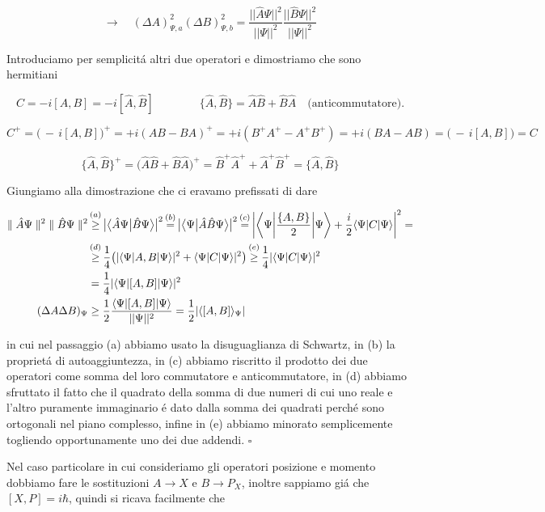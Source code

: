 $$\longrightarrow\quad(\Delta A)^{2}_{\Psi,a}(\Delta B)^{2}_{\Psi,b}=\frac{||\hat{A}\Psi||^{2}}{||\Psi||^{2}}\frac{||\hat{B}\Psi||^{2}}{||\Psi||^{2}}$$  

Introduciamo per semplicit\'a altri due operatori e dimostriamo che sono hermitiani

$$C=-i[A,B]=-i[\hat{A},\hat{B}]\qquad\qquad\{\hat{A},\hat{B}\}=\hat{A}\hat{B}+\hat{B}\hat{A}\quad\text{(anticommutatore)}.$$
	
	
$$C^+=\big(\,-\,i[A,B]\big)^+=+i(AB-BA)^+=+i(B^+A^+-A^+B^+)=+i(BA-AB)=\big(\,-\,i[A,B]\big)=C$$

$$\{\hat{A},\hat{B}\}^+=\big(\hat{A}\hat{B}+\hat{B}\hat{A}\big)^+=\hat{B}^+\hat{A}^++\hat{A}^+\hat{B}^+=\{\hat{A},\hat{B}\}$$

Giungiamo alla dimostrazione che ci eravamo prefissati di dare




\begin{align*}
	\parallel\hat{A}\Psi\parallel^2 \; \parallel\hat{B}\Psi\parallel^2  
	&\overbracket[0pt][0pt]{\geq}^{(a)}
	\big| \braket[\big]{\hat{A}\Psi}{\hat{B}\Psi} \big|^2 \overbracket[0pt][0pt]{=}^{(b)} \big| \braket[\big]{\Psi}{\hat{A}\hat{B}\Psi} \big|^2 
	\overbracket[0pt][0pt]{=}^{(c)} \bigg| \bra[\bigg]{\Psi} \frac{\{A, B\}}{2} \ket[\bigg]{\Psi} + \frac{i}{2} \bra{\Psi} C \ket{\Psi} \bigg|^2 =
	\\
	&\overbracket[0pt][0pt]{\geq}^{(d)} \frac{1}{4} \big( | \bra{\Psi}{A, B}\ket{\Psi} |^2 + \bra{\Psi} C \ket{\Psi} |^2 \big) \overbracket[0pt][0pt]{\geq}^{(e)} \frac{1}{4} | \bra{\Psi} C \ket{\Psi} |^2 
	\\
	&= \frac{1}{4} | \bra{\Psi} [A, B] \ket{\Psi} |^2 
	\\
	(\Delta A \Delta B)_\Psi 
	&\geq \frac{1}{2} \frac{\bra{\Psi} [A, B] \ket{\Psi}} {||\Psi||^2} = \frac{ 1}{ 2 } | \langle [A, B] \rangle_\Psi |
\end{align*}

in cui nel passaggio (a) abbiamo usato la disuguaglianza di Schwartz, in (b) la propriet\'a di autoaggiuntezza, in	(c) abbiamo riscritto il prodotto dei due operatori come somma del loro commutatore e anticommutatore, in (d) abbiamo sfruttato il fatto che il quadrato della somma di due numeri di cui uno reale e l'altro puramente immaginario \'e dato dalla somma dei quadrati perch\'e sono ortogonali nel piano complesso, infine in (e) abbiamo minorato semplicemente togliendo opportunamente uno dei due addendi. $\square$
	
Nel caso particolare in cui consideriamo gli operatori posizione e momento dobbiamo fare le sostituzioni $A \to X$ e $B \to P_X$, inoltre sappiamo gi\'a che $[X, P] = i\hbar$, quindi si ricava facilmente che
	
